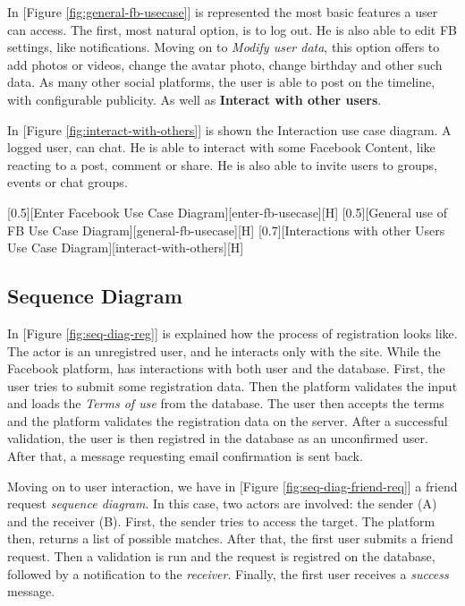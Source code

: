 \documentclass{article}
\begin{document}
			\bigskip
			In [Figure \ref{fig:general-fb-usecase}] is represented the most basic features a user can access. The first, most natural option, is to log out. He is also able to edit FB settings, like notifications. Moving on to \textit{Modify user data}, this option offers to add photos or videos, change the avatar photo, change birthday and other such data. As many other social platforms, the user is able to post on the timeline, with configurable publicity. As well as \textbf{Interact with other users}.

			\bigskip
			In [Figure \ref{fig:interact-with-others}] is shown the Interaction use case diagram. A logged user, can chat. He is able to interact with some Facebook Content, like reacting to a post, comment or share. He is also able to invite users to groups, events or chat groups.

			[0.5][Enter Facebook Use Case Diagram][enter-fb-usecase][H]
			[0.5][General use of FB Use Case Diagram][general-fb-usecase][H]
			[0.7][Interactions with other Users Use Case Diagram][interact-with-others][H]

		\subsection{Sequence Diagram}
			In [Figure \ref{fig:seq-diag-reg}] is explained how the process of registration looks like. The actor is an unregistred user, and he interacts only with the site. While the Facebook platform, has interactions with both user and the database. First, the user tries to submit some registration data. Then the platform validates the input and loads the \textit{Terms of use} from the database. The user then accepts the terms and the platform validates the registration data on the server. After a successful validation, the user is then registred in the database as an unconfirmed user. After that, a message requesting email confirmation is sent back.

			\bigskip
			Moving on to user interaction, we have in [Figure \ref{fig:seq-diag-friend-req}] a friend request \textit{sequence diagram}. In this case, two actors are involved: the sender (A) and the receiver (B). First, the sender tries to access the target. The platform then, returns a list of possible matches. After that, the first user submits a friend request. Then a validation is run and the request is registred on the database, followed by a notification to the \textit{receiver}. Finally, the first user receives a \textit{success} message.
\end{document}
